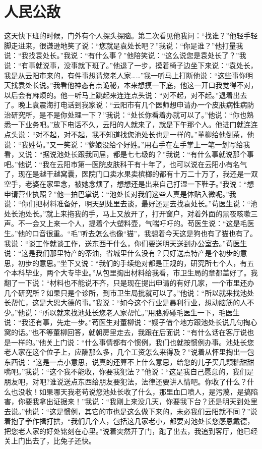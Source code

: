 \documentclass[12pt,oneside]{book}
\begin{document}
\chapter{人民公敌}
这天快下班的时候，门外有个人探头探脑。第二次看见他我问：``找谁？''他轻手轻脚走进来，很谦逊地笑了说：``您就是袁处长吧？''我说：``你是谁？''他打量我说：``我找袁处长。''我说：``有什么事？''他陪笑说：``这么说您是袁处长了？''我说：``有事就说事，没事就下班了。''他退了一步，摸着椅子边坐下来说：``袁处长，我是从云阳市来的，有件事想请您老人家\ldots\ldots{}''我一听马上打断他说：``这些事你明天找袁处长说。''我看他神态有点诡秘，本来想摸一下底，他这一开口我觉得不对，以后会有麻烦的。他一听马上跳起来连连点头说：``对不起，对不起。''退着出去了。晚上袁震海打电话到我家说：``云阳市有几个医师想申请办一个皮肤病性病防治研究所，是不是你处理一下？''我说：``处长你看着办就可以了。''他说：``你也熟悉一下业务吧。''放下电话不久，云阳的人就来了，就是下午那个人。他进门就连连点头说：``对不起，对不起，我不知道找您池处长也是一样的。''董柳给他倒茶，他说：``我姓苟。''又一笑说：``爹娘没给个好姓。''用右手在左手掌上一笔一划写给我看，又说：``据说池处长跟我同届，都是七七级的？''我说：``有什么事就说那个事吧。''他说：``我在云阳市第一医院皮肤科干有十年了，也可以说在云阳小有名气了，现在是越干越窝囊，医院门口卖水果卖槟榔的都有十万二十万了，我还是一双空手，老婆在家里念，被她念烦了，想想还是出来自己打湿一下鞋子。''我说：``想申请营业执照？''他一拍巴掌说：``池处长对我们这些人真是体贴入微呢。''我说：``你们把材料准备好，明天到处里去谈，最好还是去找袁处长。''苟医生说：``池处长池处长。''就上来拖我的手，马上又放开了，打开窗户，对着外面的黑夜咳嗽三声。不一会又上来一个人，提着个大塑料壶，气喘吁吁的。苟医生说：``这是毛医生。''他的口音很重。``毛''听去怎么也像``猫''，我想着今天这是狗也有了猫也有了。我说：``谈工作就谈工作，送东西干什么，你们要送明天送到办公室去。''苟医生说：``这是我们那里特产的茶油，省城里什么没有？只好送点特产是个初步的意思，初步的意思。''坐下又说：``我们的手续绝对都是正规的，研究所七个人，有五个本科毕业，两个大专毕业。''从包里掏出材料给我看，市卫生局的章都盖好了。我翻了一下说：``材料也不能说不齐，只是现在提出申请的有好几家，一个市里还办几个研究所？如果只是个诊所，到市卫生局批就可以了。''他说：``所以就来找池处长帮忙，这是大恩大德的事。''我说：``如今这个行业是暴利行业，想动脑筋的人不少。''他说：``所以就来找池处长您老人家帮忙。''用胳膊碰毛医生一下，毛医生说：``我还有事，先走一步。''苟医生对董柳说：``嫂子借个地方跟池处长说几句掏心窝的话。''也不等董柳回答，就朝房里走去，我跟在后面说：``有什么话在客厅说也是一样的。''他关上门说：``什么事情都有个惯例，我们也就按惯例办事。池处长您老人家在这个位子上，应酬那么多，几个工资怎么来得及？''说着从怀里掏出一包东西说：``这是一点小意思，说真的还算不上什么意思，给您的儿子买几颗糖甜甜嘴吧。''我说：``这个我不能收，你要我犯法？''他说：``这是我自己愿意的，我们是朋友吧，对吧?谁说送点东西给朋友要犯法，法律还要讲人情吧。你收了什么？什么也没收！如果哪天我老苟说您池处长收了什么，那里血口喷人，是污蔑，是搞陷害，你要我拿出证据来！''我说：``我刚上来没几天，你要我下台？还是明天到处里去说。''他说：``这是惯例，其它的市也是这么做下来的，未必我们云阳就不同？''说着抱了拳作揖打拱，``我们几个人，包括这几家老小，都要对池处长您感恩戴德，把您老人家的好处铭刻在心里。''说着突然开了门，跑了出去，我追到客厅，他已经关上门出去了，比兔子还快。
\end{document}
